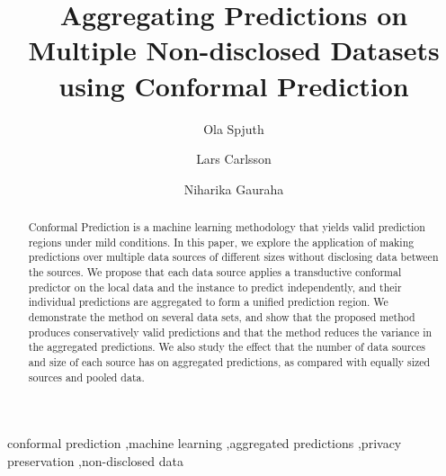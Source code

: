 \documentclass[main]{subfiles}
\begin{document}
\begin{frontmatter}

\title{Aggregating Predictions on Multiple Non-disclosed Datasets using Conformal Prediction}

\author[label1]{Ola Spjuth}
\author[label2,label3]{Lars Carlsson}
\author[label1]{Niharika Gauraha}


\address[label1]{Department of Pharmaceutical Biosciences \\
       Uppsala University\\
       Uppsala, Sweden}
\address[label2]{Department of Computer Science, \\Royal Holloway, University of London, \\Egham Hill, Egham, Surrey, United Kingdom}
\address[label3]{Stena Line, Gothenburg, Sweden}


\begin{abstract}
Conformal Prediction is a machine learning methodology that yields valid prediction regions under mild conditions. 
In this paper, we explore the application of making predictions over multiple data sources of different sizes without disclosing data between the sources.
We propose that each data source applies a transductive conformal predictor on the local data and the instance to predict independently, and their individual predictions are aggregated to form a unified prediction region. We demonstrate the method on several data sets, and show that the proposed method produces conservatively valid predictions and that the method reduces the variance in the aggregated predictions. We also study the effect that the number of data sources and size of each source has on aggregated predictions, as compared with equally sized sources and pooled data.
\end{abstract}
\begin{keyword}


conformal prediction \sep machine learning \sep aggregated predictions \sep privacy preservation \sep non-disclosed data
\end{keyword}

\end{frontmatter}
\end{document}

